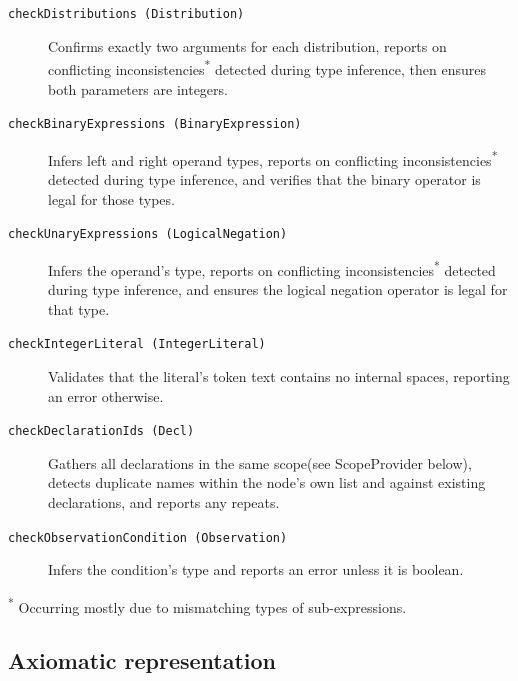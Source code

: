 \begin{description}
  \item[\texttt{checkDistributions (Distribution)}]
    Confirms exactly two arguments for each distribution, reports on conflicting inconsistencies\textsuperscript{*} detected during type inference, then ensures both parameters are integers.

  \item[\texttt{checkBinaryExpressions (BinaryExpression)}]
    Infers left and right operand types, reports on conflicting inconsistencies\textsuperscript{*} detected during type inference, and verifies that the binary operator is legal for those types.

  \item[\texttt{checkUnaryExpressions (LogicalNegation)}]
    Infers the operand's type, reports on conflicting inconsistencies\textsuperscript{*} detected during type inference, and ensures the logical negation operator is legal for that type.

  \item[\texttt{checkIntegerLiteral (IntegerLiteral)}]
    Validates that the literal's token text contains no internal spaces, reporting an error otherwise.

  \item[\texttt{checkDeclarationIds (Decl)}]
    Gathers all declarations in the same scope(see ScopeProvider below), detects duplicate names within the node's own list and against existing declarations, and reports any repeats.

  \item[\texttt{checkObservationCondition (Observation)}]
    Infers the condition's type and reports an error unless it is boolean.

\end{description}
\textsuperscript{*} Occurring mostly due to mismatching types of sub-expressions.

\subsection{Axiomatic representation}

